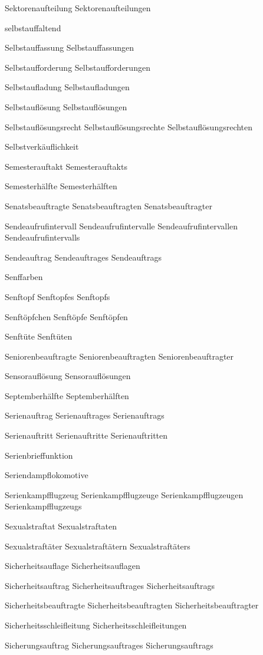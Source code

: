 Sektorenaufteilung
Sektorenaufteilungen

selbstauffaltend

Selbstauffassung
Selbstauffassungen

Selbstaufforderung
Selbstaufforderungen

Selbstaufladung
Selbstaufladungen

Selbstauflösung
Selbstauflösungen

Selbstauflösungsrecht
Selbstauflösungsrechte
Selbstauflösungsrechten

Selbstverkäuflichkeit

Semesterauftakt
Semesterauftakts

Semesterhälfte
Semesterhälften

Senatsbeauftragte
Senatsbeauftragten
Senatsbeauftragter

Sendeaufrufintervall
Sendeaufrufintervalle
Sendeaufrufintervallen
Sendeaufrufintervalls

Sendeauftrag
Sendeauftrages
Sendeauftrags

Senffarben

Senftopf
Senftopfes
Senftopfs

Senftöpfchen
Senftöpfe
Senftöpfen

Senftüte
Senftüten

Seniorenbeauftragte
Seniorenbeauftragten
Seniorenbeauftragter

Sensorauflösung
Sensorauflösungen

Septemberhälfte
Septemberhälften

Serienauftrag
Serienauftrages
Serienauftrags

Serienauftritt
Serienauftritte
Serienauftritten

Serienbrieffunktion

Seriendampflokomotive

Serienkampfflugzeug
Serienkampfflugzeuge
Serienkampfflugzeugen
Serienkampfflugzeugs

Sexualstraftat
Sexualstraftaten

Sexualstraftäter
Sexualstraftätern
Sexualstraftäters

Sicherheitsauflage
Sicherheitsauflagen

Sicherheitsauftrag
Sicherheitsauftrages
Sicherheitsauftrags

Sicherheitsbeauftragte
Sicherheitsbeauftragten
Sicherheitsbeauftragter

Sicherheitsschleifleitung
Sicherheitsschleifleitungen

Sicherungsauftrag
Sicherungsauftrages
Sicherungsauftrags

